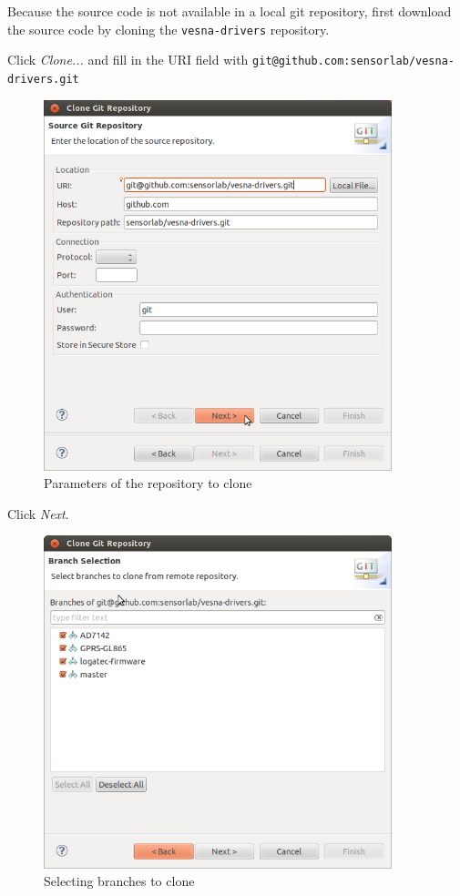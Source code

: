 \documentclass[a4paper, 10pt]{article}
\begin{document}
Because the source code is not available in a local git repository, first
download the source code by cloning the
\verb+vesna-drivers+ repository.


Click \emph{Clone...} and fill in the URI field with
\verb+git@github.com:sensorlab/vesna-drivers.git+

    \begin{figure}[H]
    \centering
        \includegraphics[width=0.9\textwidth]{./install-guide-linux-images/test-cloning-settings.png}
        \caption{Parameters of the repository to clone}
        \label{fig:test-cloning-settings}
    \end{figure}

Click \emph{Next}.

    \begin{figure}[H]
    \centering
        \includegraphics[width=0.9\textwidth]{./install-guide-linux-images/test-select-branches.png}
        \caption{Selecting branches to clone}
        \label{fig:test-select-branches}
    \end{figure}
\end{document}
